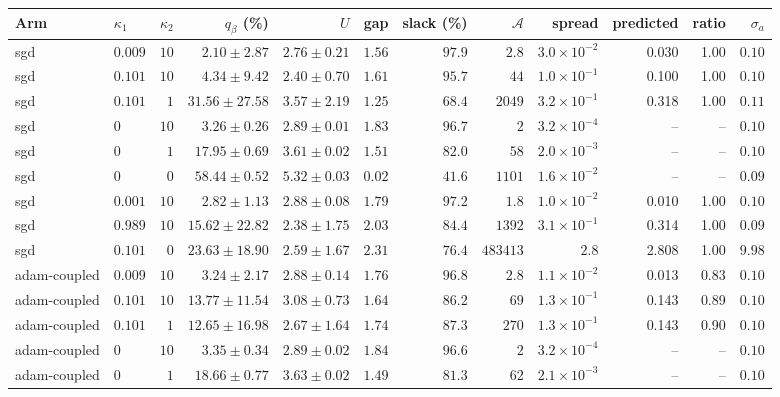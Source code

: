 \setlength{\tabcolsep}{3pt}\begin{tabular}{llrrrrrrrrrr}
\toprule
Arm & $\kappa_1$ & $\kappa_2$ & $q_\beta$ (\%) & $U$ & gap & slack (\%) & $\mathcal A$ & spread & predicted & ratio & $\sigma_a$ \\
\midrule
sgd & $0.009$ & $10$ & $2.10\pm2.87$ & $2.76\pm0.21$ & $1.56$ & $97.9$ & $2.8$ & $3.0\times10^{-2}$ & 0.030 & 1.00 & $0.10$ \\
sgd & $0.101$ & $10$ & $4.34\pm9.42$ & $2.40\pm0.70$ & $1.61$ & $95.7$ & $44$ & $1.0\times10^{-1}$ & 0.100 & 1.00 & $0.10$ \\
sgd & $0.101$ & $1$ & $31.56\pm27.58$ & $3.57\pm2.19$ & $1.25$ & $68.4$ & $2049$ & $3.2\times10^{-1}$ & 0.318 & 1.00 & $0.11$ \\
sgd & $0$ & $10$ & $3.26\pm0.26$ & $2.89\pm0.01$ & $1.83$ & $96.7$ & $2$ & $3.2\times10^{-4}$ & -- & -- & $0.10$ \\
sgd & $0$ & $1$ & $17.95\pm0.69$ & $3.61\pm0.02$ & $1.51$ & $82.0$ & $58$ & $2.0\times10^{-3}$ & -- & -- & $0.10$ \\
sgd & $0$ & $0$ & $58.44\pm0.52$ & $5.32\pm0.03$ & $0.02$ & $41.6$ & $1101$ & $1.6\times10^{-2}$ & -- & -- & $0.09$ \\
sgd & $0.001$ & $10$ & $2.82\pm1.13$ & $2.88\pm0.08$ & $1.79$ & $97.2$ & $1.8$ & $1.0\times10^{-2}$ & 0.010 & 1.00 & $0.10$ \\
sgd & $0.989$ & $10$ & $15.62\pm22.82$ & $2.38\pm1.75$ & $2.03$ & $84.4$ & $1392$ & $3.1\times10^{-1}$ & 0.314 & 1.00 & $0.09$ \\
sgd & $0.101$ & $0$ & $23.63\pm18.90$ & $2.59\pm1.67$ & $2.31$ & $76.4$ & $483413$ & $2.8$ & 2.808 & 1.00 & $9.98$ \\
\midrule
adam-coupled & $0.009$ & $10$ & $3.24\pm2.17$ & $2.88\pm0.14$ & $1.76$ & $96.8$ & $2.8$ & $1.1\times10^{-2}$ & 0.013 & 0.83 & $0.10$ \\
adam-coupled & $0.101$ & $10$ & $13.77\pm11.54$ & $3.08\pm0.73$ & $1.64$ & $86.2$ & $69$ & $1.3\times10^{-1}$ & 0.143 & 0.89 & $0.10$ \\
adam-coupled & $0.101$ & $1$ & $12.65\pm16.98$ & $2.67\pm1.64$ & $1.74$ & $87.3$ & $270$ & $1.3\times10^{-1}$ & 0.143 & 0.90 & $0.10$ \\
adam-coupled & $0$ & $10$ & $3.35\pm0.34$ & $2.89\pm0.02$ & $1.84$ & $96.6$ & $2$ & $3.2\times10^{-4}$ & -- & -- & $0.10$ \\
adam-coupled & $0$ & $1$ & $18.66\pm0.77$ & $3.63\pm0.02$ & $1.49$ & $81.3$ & $62$ & $2.1\times10^{-3}$ & -- & -- & $0.10$ \\

\end{tabular}
